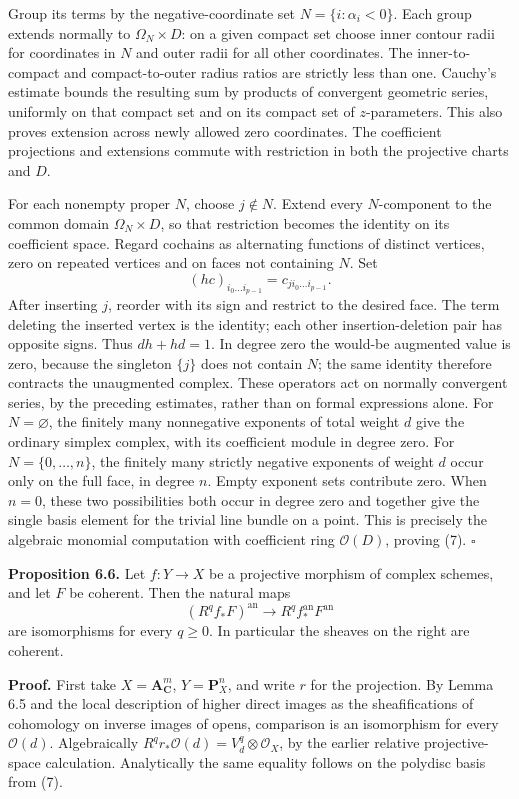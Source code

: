 \documentclass[11pt]{article}
\begin{document}
Group its terms by the negative-coordinate set \(N=\{i:\alpha_i<0\}\).
Each group extends normally to \(\Omega_N\times D\): on a given compact
set choose inner contour radii for coordinates in \(N\) and outer radii
for all other coordinates. The inner-to-compact and compact-to-outer
radius ratios are strictly less than one. Cauchy's estimate bounds the
resulting sum by products of convergent geometric series, uniformly on
that compact set and on its compact set of \(z\)-parameters. This also
proves extension across newly allowed zero coordinates. The coefficient
projections and extensions commute with restriction in both the
projective charts and \(D\).

For each nonempty proper \(N\), choose \(j\notin N\). Extend every
\(N\)-component to the common domain \(\Omega_N\times D\), so that
restriction becomes the identity on its coefficient space. Regard
cochains as alternating functions of distinct vertices, zero on repeated
vertices and on faces not containing \(N\). Set \[
(hc)_{i_0\ldots i_{p-1}}=c_{j i_0\ldots i_{p-1}}.
\] After inserting \(j\), reorder with its sign and restrict to the
desired face. The term deleting the inserted vertex is the identity;
each other insertion-deletion pair has opposite signs. Thus \(dh+hd=1\).
In degree zero the would-be augmented value is zero, because the
singleton \(\{j\}\) does not contain \(N\); the same identity therefore
contracts the unaugmented complex. These operators act on normally
convergent series, by the preceding estimates, rather than on formal
expressions alone. For \(N=\varnothing\), the finitely many nonnegative
exponents of total weight \(d\) give the ordinary simplex complex, with
its coefficient module in degree zero. For \(N=\{0,\ldots,n\}\), the
finitely many strictly negative exponents of weight \(d\) occur only on
the full face, in degree \(n\). Empty exponent sets contribute zero.
When \(n=0\), these two possibilities both occur in degree zero and
together give the single basis element for the trivial line bundle on a
point. This is precisely the algebraic monomial computation with
coefficient ring \(\mathcal O(D)\), proving (7). \(\square\)

\textbf{Proposition 6.6.} Let \(f:Y\to X\) be a projective morphism of
complex schemes, and let \(F\) be coherent. Then the natural maps \[
(R^qf_*F)^{\mathrm{an}}
\longrightarrow R^qf^{\mathrm{an}}_*F^{\mathrm{an}}
\tag{9}
\] are isomorphisms for every \(q\ge0\). In particular the sheaves on
the right are coherent.

\textbf{Proof.} First take \(X=\mathbf A^m_{\mathbf C}\),
\(Y=\mathbf P^n_X\), and write \(r\) for the projection. By Lemma 6.5
and the local description of higher direct images as the sheafifications
of cohomology on inverse images of opens, comparison is an isomorphism
for every \(\mathcal O(d)\). Algebraically
\(R^qr_*\mathcal O(d)=V_d^q\otimes\mathcal O_X\), by the earlier
relative projective-space calculation. Analytically the same equality
follows on the polydisc basis from (7).
\end{document}
